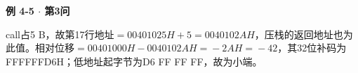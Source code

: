{\color{ink}\bfseries 例 4-5 \(\cdot \) 第3问}\par\vspace{1bp}call占5 B，故第17行地址\(=\allowbreak{}00401025H+\allowbreak{}5=\allowbreak{}0040102AH\)，压栈的返回地址也为此值。相对位移\(=\allowbreak{}00401000H-0040102AH=\allowbreak{}-2AH=\allowbreak{}-42\)，其32位补码为FFFFFFD6H；低地址起字节为D6 FF FF FF，故为小端。
